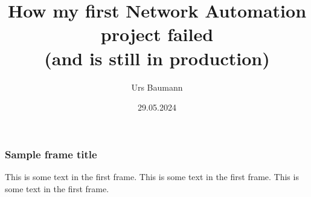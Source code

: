 \documentclass[aspectratio=169]{beamer}
\title[How my first Network Automation project failed (and is still in production)]{How my first Network Automation project failed \\ (and is still in production)}
\author{Urs Baumann}
\institute{Swisscom}
\date{29.05.2024}
\begin{document}
\frame{\titlepage}

\begin{frame}
  \frametitle{Sample frame title}
  This is some text in the first frame. This is some text in the first frame. This is some text in the first frame.
\end{frame}
\end{document}
